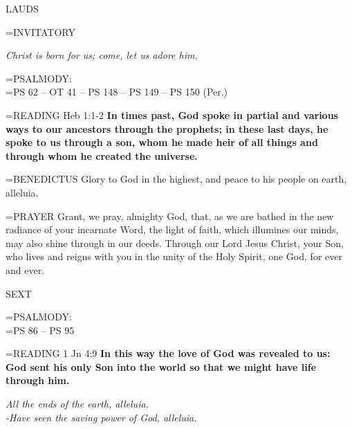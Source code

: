 \begin{flushleft}\normalsize LAUDS\\\end{flushleft}

\hangindent=\parindent \small{INVITATORY}
\begin{center}
\textit{Christ is born for us; come, let us adore him.\\}
\end{center}

\hangindent=\parindent \small{PSALMODY:}\\
\hangindent=\parindent  PS 62 -- OT 41 -- PS 148 -- PS 149 -- PS 150 (Per.) \vspace{0.5em}

\hangindent=\parindent \small{READING}    Heb 1:1-2 \textbf{   In times past, God spoke in partial and various ways to our ancestors through the prophets; in these last days, he spoke to us through a son, whom he made heir of all things and through whom he created the universe.\\}

\hangindent=\parindent \small{BENEDICTUS 	Glory to God in the highest, and peace to his people on earth, alleluia.\\}

\hangindent=\parindent \small{PRAYER 	Grant, we pray, almighty God, that, as we are bathed in the new radiance of your incarnate Word, the light of faith, which illumines our minds, may also shine through in our deeds. Through our Lord Jesus Christ, your Son, who lives and reigns with you in the unity of the Holy Spirit, one God, for ever and ever.}

\begin{flushleft}\normalsize SEXT\\\end{flushleft}

\hangindent=\parindent \small{PSALMODY:}\\
\hangindent=\parindent  PS 86 -- PS 95\vspace{0.5em}

\hangindent=\parindent \small{READING}    1 Jn 4:9 \textbf{    In this way the love of God was revealed to us: God sent his only Son into the world so that we might have life through him.}

\begin{center}
\textit{All the ends of the earth, alleluia.\\
-Have seen the saving power of God, alleluia.}
\end{center}

